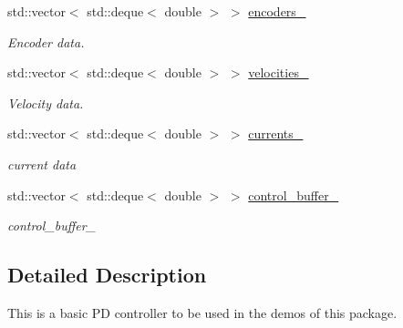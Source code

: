 \begin{DoxyCompactItemize}
\mbox{\label{classblmc__drivers_1_1ConstTorqueControl_a109a0b7342daf335e5a535cbd68b800a}} 
std\+::vector$<$ std\+::deque$<$ double $>$ $>$ \hyperlink{classblmc__drivers_1_1ConstTorqueControl_a109a0b7342daf335e5a535cbd68b800a}{encoders\+\_\+}
\begin{DoxyCompactList}\small\item\em Encoder data. \end{DoxyCompactList}\item 
\mbox{\label{classblmc__drivers_1_1ConstTorqueControl_adb46410fc955b4232e0b11c9081409b5}} 
std\+::vector$<$ std\+::deque$<$ double $>$ $>$ \hyperlink{classblmc__drivers_1_1ConstTorqueControl_adb46410fc955b4232e0b11c9081409b5}{velocities\+\_\+}
\begin{DoxyCompactList}\small\item\em Velocity data. \end{DoxyCompactList}\item 
\mbox{\label{classblmc__drivers_1_1ConstTorqueControl_aec86c0a1864866b3169af7d9938cd518}} 
std\+::vector$<$ std\+::deque$<$ double $>$ $>$ \hyperlink{classblmc__drivers_1_1ConstTorqueControl_aec86c0a1864866b3169af7d9938cd518}{currents\+\_\+}
\begin{DoxyCompactList}\small\item\em current data \end{DoxyCompactList}\item 
\mbox{\label{classblmc__drivers_1_1ConstTorqueControl_a90f61569eda4245f7ed01569a42d0ef1}} 
std\+::vector$<$ std\+::deque$<$ double $>$ $>$ \hyperlink{classblmc__drivers_1_1ConstTorqueControl_a90f61569eda4245f7ed01569a42d0ef1}{control\+\_\+buffer\+\_\+}
\begin{DoxyCompactList}\small\item\em control\+\_\+buffer\+\_\+ \end{DoxyCompactList}\end{DoxyCompactItemize}


\subsection{Detailed Description}
This is a basic PD controller to be used in the demos of this package. 

